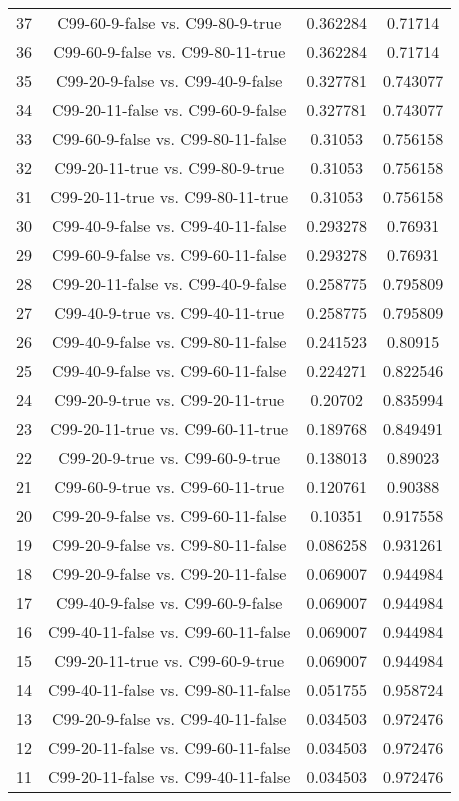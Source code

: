 \documentclass[a4paper,10pt]{article}
\begin{document}
\begin{landscape}
\begin{table}[!htp]
\begin{tabular}{cccc}
37&C99-60-9-false vs. C99-80-9-true&0.362284&0.71714\\
36&C99-60-9-false vs. C99-80-11-true&0.362284&0.71714\\
35&C99-20-9-false vs. C99-40-9-false&0.327781&0.743077\\
34&C99-20-11-false vs. C99-60-9-false&0.327781&0.743077\\
33&C99-60-9-false vs. C99-80-11-false&0.31053&0.756158\\
32&C99-20-11-true vs. C99-80-9-true&0.31053&0.756158\\
31&C99-20-11-true vs. C99-80-11-true&0.31053&0.756158\\
30&C99-40-9-false vs. C99-40-11-false&0.293278&0.76931\\
29&C99-60-9-false vs. C99-60-11-false&0.293278&0.76931\\
28&C99-20-11-false vs. C99-40-9-false&0.258775&0.795809\\
27&C99-40-9-true vs. C99-40-11-true&0.258775&0.795809\\
26&C99-40-9-false vs. C99-80-11-false&0.241523&0.80915\\
25&C99-40-9-false vs. C99-60-11-false&0.224271&0.822546\\
24&C99-20-9-true vs. C99-20-11-true&0.20702&0.835994\\
23&C99-20-11-true vs. C99-60-11-true&0.189768&0.849491\\
22&C99-20-9-true vs. C99-60-9-true&0.138013&0.89023\\
21&C99-60-9-true vs. C99-60-11-true&0.120761&0.90388\\
20&C99-20-9-false vs. C99-60-11-false&0.10351&0.917558\\
19&C99-20-9-false vs. C99-80-11-false&0.086258&0.931261\\
18&C99-20-9-false vs. C99-20-11-false&0.069007&0.944984\\
17&C99-40-9-false vs. C99-60-9-false&0.069007&0.944984\\
16&C99-40-11-false vs. C99-60-11-false&0.069007&0.944984\\
15&C99-20-11-true vs. C99-60-9-true&0.069007&0.944984\\
14&C99-40-11-false vs. C99-80-11-false&0.051755&0.958724\\
13&C99-20-9-false vs. C99-40-11-false&0.034503&0.972476\\
12&C99-20-11-false vs. C99-60-11-false&0.034503&0.972476\\
11&C99-20-11-false vs. C99-40-11-false&0.034503&0.972476\\

\end{tabular}
\end{table}
\end{landscape}
\end{document}
